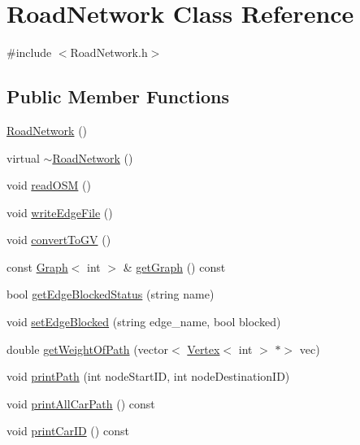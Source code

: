 \hypertarget{class_road_network}{}\section{Road\+Network Class Reference}
\label{class_road_network}


{\ttfamily \#include $<$Road\+Network.\+h$>$}

\subsection*{Public Member Functions}
\begin{DoxyCompactItemize}
\item 
\mbox{\hyperlink{class_road_network_a635cd53a27194c18870f6afc1f9e54cf}{Road\+Network}} ()
\item 
virtual \mbox{\hyperlink{class_road_network_a03a442c7c5c89bab9bb10632caefd2eb}{$\sim$\+Road\+Network}} ()
\item 
void \mbox{\hyperlink{class_road_network_abf74962fc6a63d82efcd0073c48b0d35}{read\+O\+SM}} ()
\item 
void \mbox{\hyperlink{class_road_network_a8b2c18eac996760101db4afc6c114b14}{write\+Edge\+File}} ()
\item 
void \mbox{\hyperlink{class_road_network_a280633c5b00df3dfc59bc677fc12daa3}{convert\+To\+GV}} ()
\item 
const \mbox{\hyperlink{class_graph}{Graph}}$<$ int $>$ \& \mbox{\hyperlink{class_road_network_a869771d158ffe75a2d87dd300d54281a}{get\+Graph}} () const
\item 
bool \mbox{\hyperlink{class_road_network_a60e0a20c8e393740c81fa47bc42bf9cd}{get\+Edge\+Blocked\+Status}} (string name)
\item 
void \mbox{\hyperlink{class_road_network_a981b13a5dcab7fb5a1089d0a53fc788d}{set\+Edge\+Blocked}} (string edge\+\_\+name, bool blocked)
\item 
double \mbox{\hyperlink{class_road_network_a66f44792ce48ef5b11a4f3871e7f0627}{get\+Weight\+Of\+Path}} (vector$<$ \mbox{\hyperlink{class_vertex}{Vertex}}$<$ int $>$ $\ast$$>$ vec)
\item 
void \mbox{\hyperlink{class_road_network_ae48e55423eb4341d38634ecaa2c5f928}{print\+Path}} (int node\+Start\+ID, int node\+Destination\+ID)
\item 
void \mbox{\hyperlink{class_road_network_a23597085b3fb2412a3a6a173e8d792fb}{print\+All\+Car\+Path}} () const
\item 
void \mbox{\hyperlink{class_road_network_a17723d3dcfae26cc499871334391d9b1}{print\+Car\+ID}} () const
$$
\end{DoxyCompactItemize}

